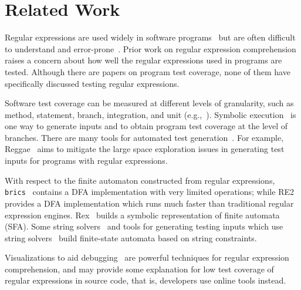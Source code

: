 \section{Related Work}
\label{sec:related}
Regular expressions are used widely in software programs~\cite{chapman2016} but are often difficult to understand and error-prone~\cite{chapman2017exploring}. Prior work on regular expression comprehension~\cite{chapman2017exploring} raises a concern about how well the regular expressions used in programs are tested. Although there are papers on program test coverage, none of them have specifically discussed testing regular expressions.

Software test coverage can be measured at different levels of granularity, such as method, statement, branch, integration, and unit (e.g.,~\cite{malaiya2002software, ammann2016introduction, zhu1997software,li2009experimental,piwowarski1993coverage}). Symbolic execution~\cite{klee,jpf,xie2005symstra,bucur2011parallel} is one way to generate inputs and to obtain program test coverage at the level of branches. There are many tools for automated test generation~\cite{zhang2011combined,fraser2013does,pacheco2007randoop}. For example, Reggae~\cite{li2009reggae} aims to mitigate the large space exploration issues in generating test inputs for programs with regular expressions. %

With respect to the finite automaton constructed from regular expressions, {\tt brics}~\cite{brics} contains a DFA implementation with very limited operations; while RE2~\cite{cox2007regular,re2} provides a DFA implementation which runs much faster than traditional regular expression engines. Rex~\cite{rex} builds a symbolic representation of finite automata (SFA). Some string solvers~\cite{kiezun2009hampi} and tools for generating testing inputs which use string solvers~\cite{wassermann2008dynamic,Ghosh:2013:JAT:2486788.2486925} build finite-state automata based on string constraints.

Visualizations to aid debugging~\cite{beck2014regviz,regex101} are  powerful techniques for regular expression comprehension, and may provide some explanation for low test coverage of regular expressions in source code, that is, developers use online tools instead. 

